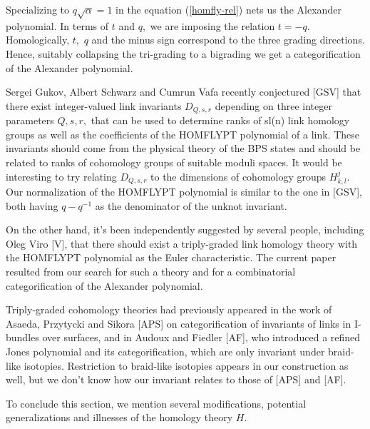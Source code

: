 \documentclass[12pt]{article}
\begin{document}
\vspace{0.2in} 

Specializing to $q\sqrt{\alpha}=1$ in the equation 
(\ref{homfly-rel}) nets us the Alexander polynomial. In terms of 
$t$ and $q,$ we are imposing the relation $t=-q.$ Homologically, 
$t,$ $q$ and the minus sign correspond to the three grading 
directions. Hence, suitably collapsing the tri-grading to a
bigrading we get a categorification of the Alexander polynomial. 

\vspace{0.1in} 

Sergei Gukov, Albert Schwarz and Cumrun Vafa 
recently conjectured [GSV] 
that there exist integer-valued link invariants $D_{Q,s,r}$ 
depending on three integer parameters $Q,s,r,$ that can be 
used to determine ranks of  sl(n) link homology groups as 
well as the coefficients of the HOMFLYPT polynomial of a link. 
These invariants should come from the physical theory of the BPS 
states and should be related to ranks of cohomology 
groups of suitable moduli spaces. It would be interesting to try relating 
$D_{Q,s,r}$ to the dimensions of cohomology groups $H^j_{k,l}.$ 
Our normalization of the HOMFLYPT polynomial 
is similar to the one in [GSV], both having $q-q^{-1}$ as the 
denominator of the unknot invariant. 

On the other hand, it's been independently 
suggested by several people, including Oleg Viro [V], that there 
should exist a triply-graded link homology theory with the HOMFLYPT 
polynomial as the Euler characteristic. The current paper resulted 
from our search for such a theory and for a combinatorial 
categorification of the Alexander polynomial. 

Triply-graded cohomology theories had previously appeared in the 
work of Asaeda, Przytycki and Sikora [APS] on categorification of 
invariants of links in I-bundles over surfaces, and in 
 Audoux and Fiedler [AF], who introduced a refined Jones polynomial 
and its categorification, which are only invariant under braid-like 
isotopies. Restriction to  braid-like isotopies appears in our 
construction as well, but 
we don't know how our invariant relates to those of [APS] and [AF].  

\vspace{0.1in} 

To conclude this section, we mention several modifications,  
potential generalizations and illnesses of the homology theory $H.$ 
\end{document}
